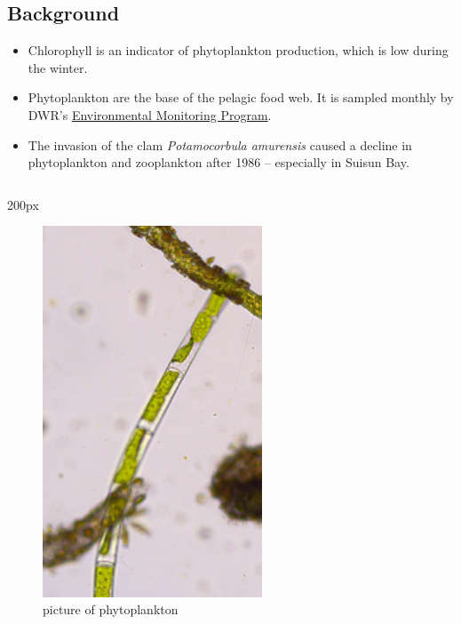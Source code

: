 \documentclass[
]{book}
\providecommand{\tightlist}{%
  \setlength{\itemsep}{0pt}\setlength{\parskip}{0pt}}
\begin{document}
\begin{column}{0.7\textwidth}
\hypertarget{background-20}{%
\subsection{Background}\label{background-20}}

\begin{itemize}
\tightlist
\item
  Chlorophyll is an indicator of phytoplankton production, which is low during the winter.
\item
  Phytoplankton are the base of the pelagic food web. It is sampled monthly by DWR's \href{https://emp.baydeltalive.com/wiki/12297}{Environmental Monitoring Program}.
\item
  The invasion of the clam \emph{Potamocorbula amurensis} caused a decline in phytoplankton and zooplankton after 1986 -- especially in Suisun Bay.
\end{itemize}
\end{column}

\begin{column}{200px\textwidth}
\begin{figure}

{\centering \includegraphics[width=2.57in]{figures/phyto} 

}

\caption{picture of phytoplankton}\label{fig:unnamed-chunk-156}
\end{figure}
\end{column}
\end{document}
